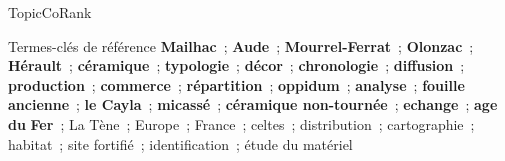 \begin{frame}{TopicCoRank}
    \begin{exampleblock}{\small Termes-clés de référence}\justifying\small
      \textbf{Mailhac}~; \textbf{Aude}~; \textbf{Mourrel-Ferrat}~;
      \textbf{Olonzac}~; \textbf{Hérault}~; \textbf{céramique}~;
      \textbf{typologie}~; \textbf{décor}~; \textbf{chronologie}~;
      \textbf{diffusion}~; \textbf{production}~; \textbf{commerce}~;
      \textbf{répartition}~; \textbf{oppidum}~; \textbf{analyse}~;
      \textbf{fouille ancienne}~; \textbf{le Cayla}~;
      \textbf{micassé}~; \textbf{céramique non-tournée}~;
      \textbf{echange}~; \textbf{age du} \textbf{Fer}~; La Tène~;
      Europe~; France~; celtes~; distribution~; cartographie~; habitat~; site
      fortifié~; identification~; étude du matériel
    \end{exampleblock}
\end{frame}

